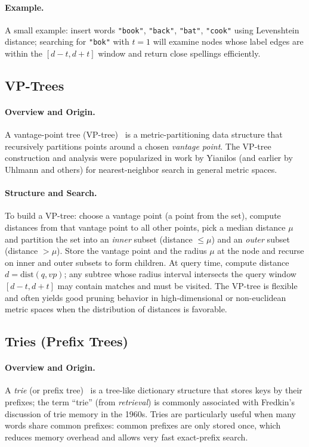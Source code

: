 \documentclass[acmsmall,screen, nonacm]{acmart}
\begin{document}
\paragraph{Example.}
A small example: insert words \texttt{"book"}, \texttt{"back"}, \texttt{"bat"}, \texttt{"cook"} using Levenshtein distance; searching for \texttt{"bok"} with $t=1$ will examine nodes whose label edges are within the $[d-t,d+t]$ window and return close spellings efficiently.

\subsection{VP-Trees}
\paragraph{Overview and Origin.}
A vantage-point tree (VP-tree)~\cite{wikipediaVantagepointTree} is a metric-partitioning data structure that recursively partitions points around a chosen \emph{vantage point}. The VP-tree construction and analysis were popularized in work by Yianilos (and earlier by Uhlmann and others) for nearest-neighbor search in general metric spaces.

\paragraph{Structure and Search.}
To build a VP-tree: choose a vantage point (a point from the set), compute distances from that vantage point to all other points, pick a median distance $\mu$ and partition the set into an \emph{inner} subset (distance $\le\mu$) and an \emph{outer} subset (distance $>\mu$). Store the vantage point and the radius $\mu$ at the node and recurse on inner and outer subsets to form children. At query time, compute distance $d=\mathrm{dist}(q, vp)$; any subtree whose radius interval intersects the query window $[d- t, d+ t]$ may contain matches and must be visited. The VP-tree is flexible and often yields good pruning behavior in high-dimensional or non-euclidean metric spaces when the distribution of distances is favorable.

\subsection{Tries (Prefix Trees)}
\paragraph{Overview and Origin.}
A \emph{trie} (or prefix tree)~\cite{wikipediaTrieWikipedia} is a tree-like dictionary structure that stores keys by their prefixes; the term ``trie'' (from \emph{retrieval}) is commonly associated with Fredkin's discussion of trie memory in the 1960s. Tries are particularly useful when many words share common prefixes: common prefixes are only stored once, which reduces memory overhead and allows very fast exact-prefix search.
\end{document}
